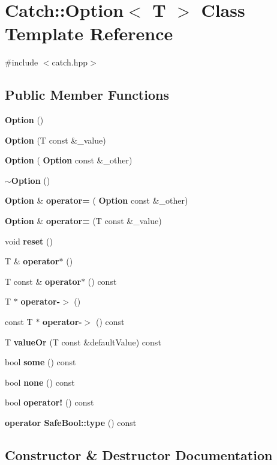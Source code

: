 \section{Catch\+:\+:Option$<$ T $>$ Class Template Reference}
\label{class_catch_1_1_option}


{\ttfamily \#include $<$catch.\+hpp$>$}

\subsection*{Public Member Functions}
\begin{DoxyCompactItemize}
\item 
\textbf{ Option} ()
\item 
\textbf{ Option} (T const \&\+\_\+value)
\item 
\textbf{ Option} (\textbf{ Option} const \&\+\_\+other)
\item 
\textbf{ $\sim$\+Option} ()
\item 
\textbf{ Option} \& \textbf{ operator=} (\textbf{ Option} const \&\+\_\+other)
\item 
\textbf{ Option} \& \textbf{ operator=} (T const \&\+\_\+value)
\item 
void \textbf{ reset} ()
\item 
T \& \textbf{ operator$\ast$} ()
\item 
T const  \& \textbf{ operator$\ast$} () const
\item 
T $\ast$ \textbf{ operator-\/$>$} ()
\item 
const T $\ast$ \textbf{ operator-\/$>$} () const
\item 
T \textbf{ value\+Or} (T const \&default\+Value) const
\item 
bool \textbf{ some} () const
\item 
bool \textbf{ none} () const
\item 
bool \textbf{ operator!} () const
\item 
\textbf{ operator Safe\+Bool\+::type} () const
\end{DoxyCompactItemize}


\subsection{Constructor \& Destructor Documentation}
\mbox{\label{class_catch_1_1_option_a8efb01b593d798decc80cbbdf311f2a3}} 
